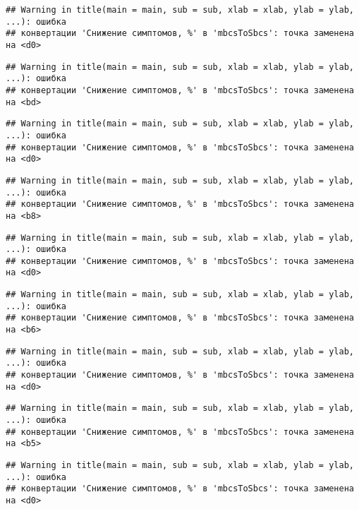 \documentclass[
]{article}
\begin{document}
\begin{verbatim}
## Warning in title(main = main, sub = sub, xlab = xlab, ylab = ylab, ...): ошибка
## конвертации 'Снижение симптомов, %' в 'mbcsToSbcs': точка заменена на <d0>
\end{verbatim}

\begin{verbatim}
## Warning in title(main = main, sub = sub, xlab = xlab, ylab = ylab, ...): ошибка
## конвертации 'Снижение симптомов, %' в 'mbcsToSbcs': точка заменена на <bd>
\end{verbatim}

\begin{verbatim}
## Warning in title(main = main, sub = sub, xlab = xlab, ylab = ylab, ...): ошибка
## конвертации 'Снижение симптомов, %' в 'mbcsToSbcs': точка заменена на <d0>
\end{verbatim}

\begin{verbatim}
## Warning in title(main = main, sub = sub, xlab = xlab, ylab = ylab, ...): ошибка
## конвертации 'Снижение симптомов, %' в 'mbcsToSbcs': точка заменена на <b8>
\end{verbatim}

\begin{verbatim}
## Warning in title(main = main, sub = sub, xlab = xlab, ylab = ylab, ...): ошибка
## конвертации 'Снижение симптомов, %' в 'mbcsToSbcs': точка заменена на <d0>
\end{verbatim}

\begin{verbatim}
## Warning in title(main = main, sub = sub, xlab = xlab, ylab = ylab, ...): ошибка
## конвертации 'Снижение симптомов, %' в 'mbcsToSbcs': точка заменена на <b6>
\end{verbatim}

\begin{verbatim}
## Warning in title(main = main, sub = sub, xlab = xlab, ylab = ylab, ...): ошибка
## конвертации 'Снижение симптомов, %' в 'mbcsToSbcs': точка заменена на <d0>
\end{verbatim}

\begin{verbatim}
## Warning in title(main = main, sub = sub, xlab = xlab, ylab = ylab, ...): ошибка
## конвертации 'Снижение симптомов, %' в 'mbcsToSbcs': точка заменена на <b5>
\end{verbatim}

\begin{verbatim}
## Warning in title(main = main, sub = sub, xlab = xlab, ylab = ylab, ...): ошибка
## конвертации 'Снижение симптомов, %' в 'mbcsToSbcs': точка заменена на <d0>
\end{verbatim}
\end{document}
